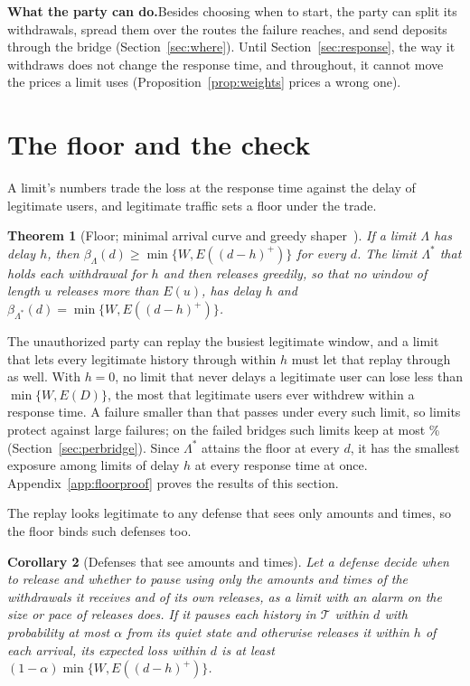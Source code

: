 \documentclass[conference,compsoc]{IEEEtran}
\numberwithin{equation}{section}
\theoremstyle{plain}
\newtheorem{theorem}{Theorem}[section]
\newtheorem{corollary}[theorem]{Corollary}
\theoremstyle{definition}
\theoremstyle{remark}
\newcommand{\runin}[1]{\par\smallskip\noindent\textbf{#1.}\enspace}
\newcommand{\Tset}{\mathcal{T}}
\begin{document}
\runin{What the party can do}Besides choosing when to start, the party can split its withdrawals, spread them over the routes the failure reaches, and send deposits through the bridge (Section~\ref{sec:where}). Until Section~\ref{sec:response}, the way it withdraws does not change the response time, and throughout, it cannot move the prices a limit uses (Proposition~\ref{prop:weights} prices a wrong one).

\section{The floor and the check}\label{sec:floor}

A limit's numbers trade the loss at the response time against the delay of legitimate users, and legitimate traffic sets a floor under the trade.

\begin{theorem}[Floor; minimal arrival curve and greedy shaper~\cite{leboudec2001}]\label{thm:floor}
If a limit $\Lambda$ has delay $h$, then $\beta_\Lambda(d) \ge \min\{W, E((d-h)^+)\}$ for every $d$. The limit $\Lambda^*$ that holds each withdrawal for $h$ and then releases greedily, so that no window of length $u$ releases more than $E(u)$, has delay $h$ and $\beta_{\Lambda^*}(d) = \min\{W, E((d-h)^+)\}$.
\end{theorem}

The unauthorized party can replay the busiest legitimate window, and a limit that lets every legitimate history through within $h$ must let that replay through as well. With $h = 0$, no limit that never delays a legitimate user can lose less than $\min\{W, E(D)\}$, the most that legitimate users ever withdrew within a response time. A failure smaller than that passes under every such limit, so limits protect against large failures; on the failed bridges such limits keep at most \pbFloorPctR\% (Section~\ref{sec:perbridge}). Since $\Lambda^*$ attains the floor at every $d$, it has the smallest exposure among limits of delay $h$ at every response time at once. Appendix~\ref{app:floorproof} proves the results of this section.

The replay looks legitimate to any defense that sees only amounts and times, so the floor binds such defenses too.

\begin{corollary}[Defenses that see amounts and times]\label{cor:anydefense}
Let a defense decide when to release and whether to pause using only the amounts and times of the withdrawals it receives and of its own releases, as a limit with an alarm on the size or pace of releases does. If it pauses each history in $\Tset$ within $d$ with probability at most $\alpha$ from its quiet state and otherwise releases it within $h$ of each arrival, its expected loss within $d$ is at least $(1-\alpha)\min\{W, E((d-h)^+)\}$.
\end{corollary}
\end{document}
